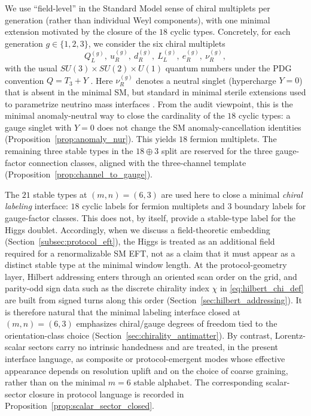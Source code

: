 We use ``field-level'' in the Standard Model sense of chiral multiplets per generation (rather than individual Weyl components), with one minimal extension motivated by the closure of the $18$ cyclic types.
Concretely, for each generation $g\in\{1,2,3\}$, we consider the six chiral multiplets
\[
Q_L^{(g)},\ u_R^{(g)},\ d_R^{(g)},\ L_L^{(g)},\ e_R^{(g)},\ \nu_R^{(g)},
\]
with the usual $SU(3)\times SU(2)\times U(1)$ quantum numbers under the PDG convention $Q=T_3+Y$ \cite{PeskinSchroeder1995,PDGRPP2024}.
Here $\nu_R^{(g)}$ denotes a neutral singlet (hypercharge $Y=0$) that is absent in the minimal SM, but standard in minimal sterile extensions used to parametrize neutrino mass interfaces \cite{PDGRPP2024}.
From the audit viewpoint, this is the minimal anomaly-neutral way to close the cardinality of the $18$ cyclic types: a gauge singlet with $Y=0$ does not change the SM anomaly-cancellation identities (Proposition~\ref{prop:anomaly_nur}).
This yields $18$ fermion multiplets.
The remaining three stable types in the $18\oplus 3$ split are reserved for the three gauge-factor connection classes, aligned with the three-channel template (Proposition~\ref{prop:channel_to_gauge}).
\begin{remark}\label{rem:higgs_not_in_21}
The $21$ stable types at $(m,n)=(6,3)$ are used here to close a minimal \emph{chiral labeling} interface: $18$ cyclic labels for fermion multiplets and $3$ boundary labels for gauge-factor classes.
This does not, by itself, provide a stable-type label for the Higgs doublet.
Accordingly, when we discuss a field-theoretic embedding (Section~\ref{subsec:protocol_eft}), the Higgs is treated as an additional field required for a renormalizable SM EFT, not as a claim that it must appear as a distinct stable type at the minimal window length.
At the protocol-geometry layer, Hilbert addressing enters through an oriented scan order on the grid, and parity-odd sign data such as the discrete chirality index $\chi$ in \eqref{eq:hilbert_chi_def} are built from signed turns along this order (Section~\ref{sec:hilbert_addressing}).
It is therefore natural that the minimal labeling interface closed at $(m,n)=(6,3)$ emphasizes chiral/gauge degrees of freedom tied to the orientation-class choice (Section~\ref{sec:chirality_antimatter}).
By contrast, Lorentz-scalar sectors carry no intrinsic handedness and are treated, in the present interface language, as composite or protocol-emergent modes whose effective appearance depends on resolution uplift and on the choice of coarse graining, rather than on the minimal $m=6$ stable alphabet.
The corresponding scalar-sector closure in protocol language is recorded in Proposition~\ref{prop:scalar_sector_closed}.
\end{remark}


